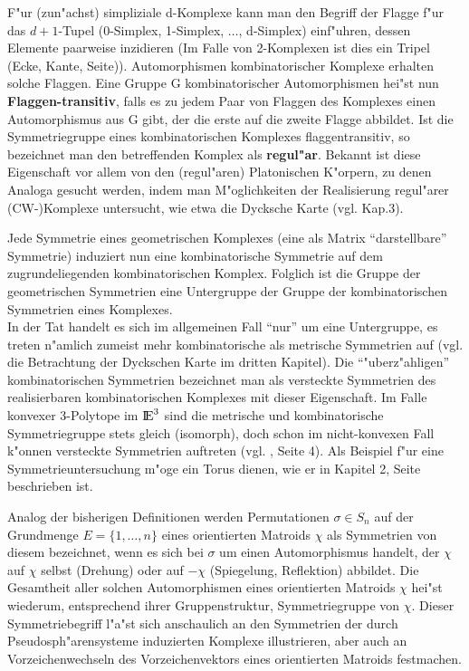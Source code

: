 F"ur (zun"achst) simpliziale d-Komplexe kann man den Begriff der Flagge
 f"ur das $d+1$-Tupel (0-Simplex, 1-Simplex, $\ldots$, d-Simplex)
einf"uhren, dessen Elemente paarweise inzidieren (Im Falle von 2-Kom\-plexen
ist dies ein Tripel (Ecke, Kante, Seite)). Automorphismen kombinatorischer
Komplexe\label{flag} erhalten solche Flaggen. Eine Gruppe G kombinatorischer
Automorphismen hei"st nun {\bf Flaggen-transitiv},
falls es zu jedem Paar von Flaggen des Komplexes einen Automorphismus aus G
gibt, der die erste auf die zweite Flagge abbildet. Ist die Symmetriegruppe
eines kombinatorischen Komplexes flaggentransitiv, so bezeichnet man den
betreffenden Komplex als {\bf regul"ar}.
Bekannt ist diese Eigenschaft vor allem von den (regul"aren) Platonischen
K"orpern, zu denen Analoga gesucht werden, indem man M"oglichkeiten der
Realisierung regul"arer (CW-)Komplexe untersucht, wie etwa die Dycksche Karte
(vgl. Kap.3).

Jede Symmetrie eines geometrischen Komplexes (eine als Matrix "`darstellbare"'
Symmetrie) induziert nun eine kombinatorische Symmetrie auf dem
zugrundeliegenden kombinatorischen Komplex. Folglich ist die Gruppe der
geometrischen Symmetrien eine Untergruppe der Gruppe der kombinatorischen
Symmetrien eines Komplexes.\\
In der Tat handelt es sich im allgemeinen Fall "`nur"' um eine Untergruppe, es
treten n"amlich zumeist mehr kombinatorische als metrische Symmetrien auf (vgl.
die Betrachtung der Dyckschen Karte im dritten Kapitel). Die "`"uberz"ahligen"'
kombinatorischen Symmetrien bezeichnet man als versteckte Symmetrien
 des realisierbaren kombinatorischen Komplexes mit
dieser Eigenschaft. Im Falle konvexer 3-Polytope im $\mbox{$\rm I\!E$}^3$ sind die metrische
und kombinatorische Symmetriegruppe stets gleich (isomorph), doch schon im
nicht-konvexen Fall k"onnen versteckte Symmetrien auftreten (vgl. \cite{Bo:91},
Seite 4). Als Beispiel f"ur eine Symmetrieuntersuchung m"oge ein Torus dienen,
wie er in Kapitel 2, Seite \pageref{torus1} beschrieben ist.

Analog der bisherigen Definitionen werden Permutationen $\sigma\in S_n$ auf
der Grundmenge $E=\{1,\ldots,n\}$ eines orientierten Matroids $\chi$ als
Symmetrien von diesem bezeichnet, wenn es sich bei $\sigma$ um einen
Automorphismus handelt, der $\chi$ auf $\chi$ selbst (Drehung) oder
auf $-\chi$ (Spiegelung, Reflektion) abbildet. Die Gesamtheit aller
solchen Automorphismen eines orientierten Matroids $\chi$ hei"st wiederum,
entsprechend ihrer Gruppenstruktur, Symmetriegruppe von $\chi$.
 Dieser Symmetriebegriff
l"a"st sich anschaulich an den Symmetrien der durch Pseudosph"arensysteme
induzierten Komplexe illustrieren, aber auch an Vorzeichenwechseln des
Vorzeichenvektors eines orientierten Matroids festmachen.

